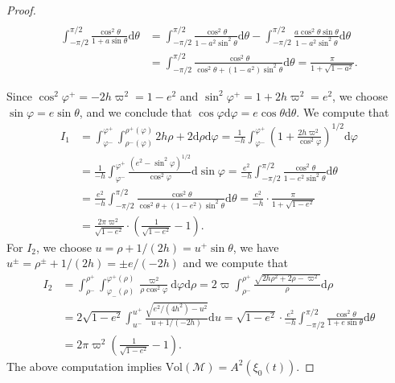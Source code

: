 \documentclass[11pt]{amsart}
\newcommand{\om}{\varpi}
\begin{document}
\begin{proof}
\begin{equation}
\begin{aligned}
		\end{aligned}
	\end{equation}
	\begin{equation} \label{formula 2} \begin{aligned}
	\int_{-\pi\slash2}^{\pi\slash2}\frac{\cos^2\theta}{1+a\sin\theta}\mathrm{d} \theta&=\int_{-\pi\slash2}^{\pi\slash2}\frac{\cos^2\theta}{1-a^2\sin^{2}\theta}\mathrm{d} \theta-\int_{-\pi\slash2}^{\pi\slash2}\frac{a\cos^2\theta\sin\theta}{1-a^2\sin^{2}\theta}\mathrm{d} \theta\\
			&=\int_{-\pi\slash2}^{\pi\slash2}\frac{\cos^2\theta}{\cos^{2}\theta+(1-a^2)\sin^{2}\theta}\mathrm{d} \theta=\frac{\pi}{1+\sqrt{1-a^2}}.
	\end{aligned}		
	\end{equation}

	Since $\cos^2\varphi^+=-2h\om^2=1-e^2$ and $\sin^2\varphi^+=1+2h\om^2=e^2$, we choose $\sin\varphi=e\sin\theta$, and we conclude that $\cos\varphi\mathrm{d}\varphi=e\cos\theta\mathrm{d}\theta$. We compute that
	$$
	\begin{aligned}
		I_1&=\int_{\varphi^-}^{\varphi^+}\int_{\rho^-(\varphi)}^{\rho^+(\varphi)}2h\rho+2 \mathrm{d}\rho \mathrm{d}\varphi=\frac{1}{-h}\int_{\varphi^-}^{\varphi^+}\left(1+\frac{2h\om^{2}}{\cos^2\varphi}\right)^{1/2}\mathrm{d} \varphi\\
		&=\frac{1}{-h}\int_{\varphi^-}^{\varphi^+}\frac{(e^2-\sin^{2}\varphi)^{1/2}}{\cos^2\varphi}\mathrm{d}\sin \varphi=\frac{e^2}{-h}\int_{-\pi/2}^{\pi/2}\frac{\cos^{2}\theta}{1-e^2\sin^2\theta}\mathrm{d} \theta\\
		&=\frac{e^2}{-h}\int_{-\pi\slash2}^{\pi\slash2}\frac{\cos^2\theta}{\cos^2\theta+(1-e^2)\sin^{2}\theta}\mathrm{d} \theta=\frac{e^2}{-h}\cdot\frac{\pi}{1+\sqrt{1-e^2}}\\
		&=\frac{2\pi\om^2}{\sqrt{1-e^2}}\cdot\left(\frac{1}{\sqrt{1-e^{2}}}-1\right). 
	\end{aligned}$$
	For $I_2$, we choose $u=\rho+1/(2h)=u^+\sin\theta$, we have $u^\pm=\rho^\pm+1/(2h)=\pm e/(-2h)$ and we compute that 
	$$
	\begin{aligned}
		I_2&=\int_{\rho^-}^{\rho^+}\int_{\varphi_-(\rho)}^{\varphi^+(\rho)}\frac{\om^2}{\rho\cos^2\varphi} \mathrm{d}\varphi \mathrm{d}\rho=2\om\int_{\rho^-}^{\rho^+}\frac{\sqrt{2h\rho^2+2\rho-\om^{2}}}{\rho}\mathrm{d} \rho\\    &=2\sqrt{1-e^2}\int_{u^-}^{u^+}\frac{\sqrt{e^2/(4h^2)-u^{2}}}{u+1/(-2h)}\mathrm{d} u=\sqrt{1-e^2}\cdot\frac{e^2}{-h}\int_{-\pi\slash2}^{\pi\slash2}\frac{\cos^2\theta}{1+e\sin\theta}\mathrm{d} \theta\\
		&=2\pi\om^2\left(\frac{1}{\sqrt{1-e^{2}}}-1\right).
	\end{aligned}$$
	The above computation implies $\text{Vol}(\mathcal{M}) =A^2(\xi_0(t))$. 
\end{proof}
\end{document}
